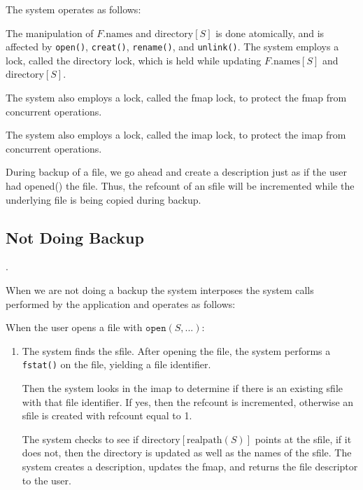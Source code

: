 \documentclass[10pt]{article}
\begin{document}
The system operates as follows:

The manipulation of $F.\mbox{names}$ and $\mbox{directory}[S]$ is done
atomically, and is affected by \texttt{open()}, \texttt{creat()},
\texttt{rename()}, and \texttt{unlink()}.  The system employs a lock,
called the directory lock, which is held while updating
$F.\mbox{names}[S]$ and $\mbox{directory}[S]$.

The system also employs a lock, called the fmap lock, to protect the
fmap from concurrent operations.

The system also employs a lock, called the imap lock, to protect the imap from concurrent operations.

During backup of a file, we go ahead and create a description just as
if the user had opened() the file.  Thus, the refcount of an sfile
will be incremented while the underlying file is being copied during
backup.


\subsection*{Not Doing Backup}

.

When we are not doing a backup the system interposes the system calls
performed by the application and operates as follows:

When the user opens a file with $\texttt{open}(S,...)$:
 \begin{enumerate}
 \item The system finds the sfile.  After opening the file, the system
   performs a \texttt{fstat()} on the file, yielding a file identifier.

   Then the system looks in the imap to determine if there is an existing sfile with that file identifier.  If yes, then the refcount is incremented, otherwise an sfile is created with refcount equal to 1.

   The system checks to see if $\mbox{directory}[\mbox{realpath}(S)]$ points at the sfile, if it does not, then the directory is updated as well as the names of the sfile.
   The system creates a description, updates the fmap, and returns the file descriptor to the user.

   \end{enumerate}   

\end{document}
